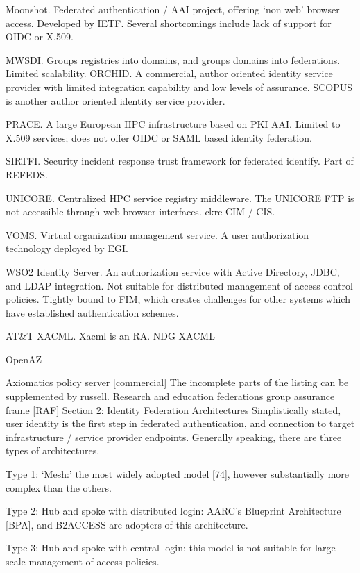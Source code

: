 \documentclass[12pt]{article}
\begin{document}
Moonshot. Federated authentication / AAI project, offering ‘non web’ browser access. Developed by IETF. Several shortcomings include lack of support for OIDC or X.509.

MWSDI. Groups registries into domains, and groups domains into federations. Limited scalability.
ORCHID. A commercial, author oriented identity service provider with limited integration capability and low levels of assurance. SCOPUS is another author oriented identity service provider. 

PRACE. A large European HPC infrastructure based on PKI AAI. Limited to X.509 services; does not offer OIDC or SAML based identity federation. 

SIRTFI. Security incident response trust framework for federated identify. Part of REFEDS. 

UNICORE. Centralized HPC service registry middleware. The UNICORE FTP is not accessible through web browser interfaces. ckre CIM / CIS.

VOMS. Virtual organization management service. A user authorization technology deployed by EGI. 

WSO2 Identity Server. An authorization service with Active Directory, 
JDBC, and LDAP integration. Not suitable for distributed management of access control policies. Tightly bound to FIM, which creates challenges for other systems which have established authentication schemes. 

AT&T XACML. Xacml is an RA. NDG XACML

OpenAZ 

Axiomatics policy server [commercial]
The incomplete parts of the listing can be supplemented by russell. 
Research and education federations group assurance frame [RAF]
Section 2: Identity Federation Architectures
Simplistically stated, user identity is the first step in federated authentication, and connection to target infrastructure / service provider endpoints. Generally speaking, there are three types of architectures. 

Type 1: ‘Mesh:’ the most widely adopted model [74], however substantially more complex than the others. 

Type 2: Hub and spoke with distributed login: AARC’s Blueprint Architecture [BPA], and B2ACCESS are adopters of this architecture.  

Type 3: Hub and spoke with central login: this model is not suitable for large scale management of access policies. 
\end{document}
